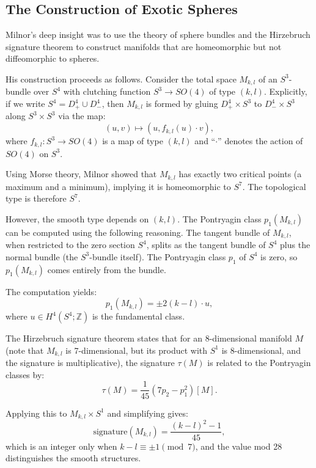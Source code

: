 \subsection{The Construction of Exotic Spheres}

Milnor's deep insight was to use the theory of sphere bundles and the Hirzebruch signature theorem to construct manifolds that are homeomorphic but not diffeomorphic to spheres.

His construction proceeds as follows. Consider the total space $M_{k,l}$ of an $S^3$-bundle over $S^4$ with clutching function $S^3 \to SO(4)$ of type $(k,l)$. Explicitly, if we write $S^4 = D^4_+ \cup D^4_-$, then $M_{k,l}$ is formed by gluing $D^4_+ \times S^3$ to $D^4_- \times S^3$ along $S^3 \times S^3$ via the map:
\[
(u,v) \mapsto (u, f_{k,l}(u) \cdot v),
\]
where $f_{k,l}: S^3 \to SO(4)$ is a map of type $(k,l)$ and ``$\cdot$'' denotes the action of $SO(4)$ on $S^3$.

Using Morse theory, Milnor showed that $M_{k,l}$ has exactly two critical points (a maximum and a minimum), implying it is homeomorphic to $S^7$. The topological type is therefore $S^7$.

However, the smooth type depends on $(k,l)$. The Pontryagin class $p_1(M_{k,l})$ can be computed using the following reasoning. The tangent bundle of $M_{k,l}$, when restricted to the zero section $S^4$, splits as the tangent bundle of $S^4$ plus the normal bundle (the $S^3$-bundle itself). The Pontryagin class $p_1$ of $S^4$ is zero, so $p_1(M_{k,l})$ comes entirely from the bundle.

The computation yields:
\[
p_1(M_{k,l}) = \pm 2(k-l) \cdot u,
\]
where $u \in H^4(S^4; \mathbb{Z})$ is the fundamental class.

The Hirzebruch signature theorem states that for an 8-dimensional manifold $M$ (note that $M_{k,l}$ is 7-dimensional, but its product with $S^1$ is 8-dimensional, and the signature is multiplicative), the signature $\tau(M)$ is related to the Pontryagin classes by:
\[
\tau(M) = \frac{1}{45}(7p_2 - p_1^2)[M].
\]

Applying this to $M_{k,l} \times S^1$ and simplifying gives:
\[
\text{signature}(M_{k,l}) = \frac{(k-l)^2 - 1}{45},
\]
which is an integer only when $k-l \equiv \pm 1 \pmod{7}$, and the value mod 28 distinguishes the smooth structures.


